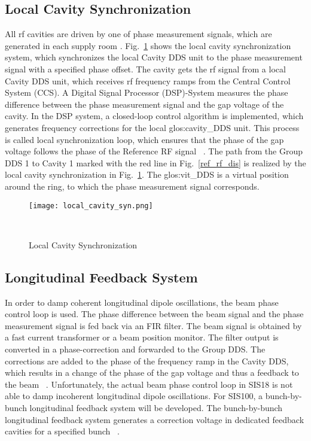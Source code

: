 \subsection{Local Cavity Synchronization}
All rf cavities are driven by one of phase measurement signals, which are generated in each supply room . Fig.~\ref{local_cavity_syn} shows the local cavity synchronization system, which synchronizes the local Cavity DDS unit to the phase measurement signal with a specified phase offset. The cavity gets the rf signal from a local Cavity \gls{DDS} unit, which receives rf frequency ramps from the Central Control System (\gls{CCS}). A Digital Signal Processor (\gls{DSP})-System measures the phase difference between the phase measurement signal and the gap voltage of the cavity. In the DSP system, a closed-loop control algorithm is implemented, which generates frequency corrections for the local \gls{glos:cavity_DDS} unit. This process is called local synchronization loop, which ensures that the phase of the gap voltage follows the phase of the Reference RF signal ~\cite{klingbeil_new_2011}. The path from the Group DDS 1 to Cavity 1 marked with the red line in Fig.~\ref{ref_rf_dis} is realized by the local cavity synchronization in Fig.~\ref{local_cavity_syn}. The \gls{glos:vit_DDS} is a virtual position around the ring, to which the phase measurement signal corresponds.
\begin{figure}[H]
   \centering   
   \texttt{[image: local\_cavity\_syn.png]}
   \caption{Local Cavity Synchronization}{~\cite{klingbeil_new_2011}}
   \label{local_cavity_syn}
\end{figure}
\subsection{Longitudinal Feedback System}
In order to damp coherent longitudinal dipole oscillations, the beam phase control loop is used. The phase difference between the beam signal and the phase measurement signal is fed back via an FIR filter. The beam signal is obtained by a fast current transformer or a beam position monitor. The filter output is converted in a phase-correction and forwarded to the Group DDS. The corrections are added to the phase of the  frequency ramp in the Cavity DDS, which results in a change of the phase of the gap voltage and thus a feedback to the beam ~\cite{baudrenghien_low-level_2010}. Unfortunately, the actual beam phase control loop in SIS18 is not able to damp incoherent longitudinal dipole oscillations. For SIS100, a bunch-by-bunch longitudinal feedback system will be developed. The bunch-by-bunch longitudinal feedback system generates a correction voltage in dedicated feedback cavities for a specified bunch ~\cite{gross_bunch-by-bunch_2015}. 

